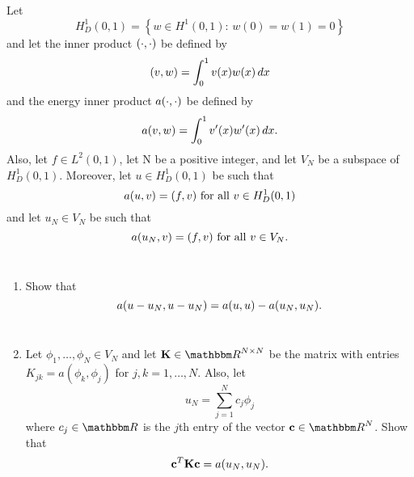 
Let
\[
H^1_D(0,1)=\left\{w\in H^1(0,1):\,w(0)=w(1)=0\right\}
\]
and let the inner product $(\cdot,\cdot)$ %
be defined by
\[
(v,w)=\int_0^1v(x)w(x)\,dx
\]
and the energy inner product $a(\cdot,\cdot)$ %
be defined by
\[
a(v,w)=\int_0^1v'(x)w'(x)\,dx.
\]
Also, let $f\in L^2(0,1)$, let N be a positive integer, and let $V_N$ be a subspace of $H^1_D(0,1)$. Moreover, let $u\in H^1_D(0,1)$ be such that
\[
a(u,v)=(f,v)\mbox{ for all }v\in H^1_D(0,1)
\]
and let $u_N\in V_N$ be such that
\[
a(u_N,v)=(f,v)\mbox{ for all }v\in V_N.
\]
\\
\begin{enumerate}
\item Show that
\[
a(u-u_N,u-u_N)=a(u,u)-a(u_N,u_N).
\]
\\
\item Let $\phi_1,\ldots,\phi_N\in V_N$ and let $\BK\in\R^{N\times N}$ be the matrix with entries $K_{jk}=a(\phi_k,\phi_j)$ for $j,k=1,\ldots,N$. Also, let
\[
u_N=\sum_{j=1}^Nc_j\phi_j
\]
where $c_j\in\R$ is the $j$th entry of the vector $\Bc\in\R^N$. Show that
\[
{\bf c}^T{\bf K}{\bf c}=a(u_N,u_N).
\]
\end{enumerate}

           

